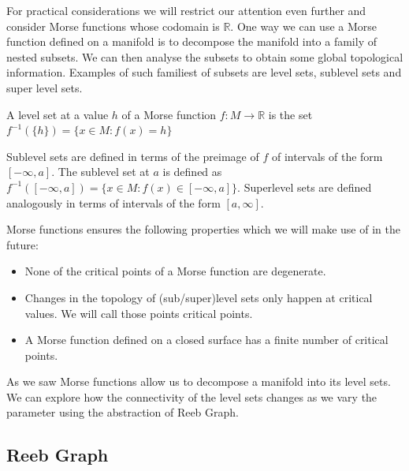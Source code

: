 For practical considerations we will restrict our attention even further and consider Morse functions whose codomain is $\mathbb{R}$. One way we can use a Morse function defined on a manifold is to decompose the manifold into a family of nested subsets. We can then analyse the subsets to obtain some global topological information. Examples of such familiest of subsets are level sets, sublevel sets and super level sets.

\begin{defn} A level set at a value $h$ of a Morse function $f: M \to \mathbb{R}$ is the set $f^{-1}(\{h\}) = \{x \in M: f(x) = h \}$   \end{defn}

Sublevel sets are defined in terms of the preimage of $f$ of intervals of the form $[-\infty, a]$. The sublevel set at $a$ is defined as $f^{-1}([-\infty, a]) = \{x \in M: f(x) \in [-\infty, a] \}$. Superlevel sets are defined analogously in terms of intervals of the form $[a, \infty]$.


Morse functions ensures the following properties which we will make use of in the future:

\begin{itemize}
    \item None of the critical points of a Morse function are degenerate.
    \item Changes in the topology of (sub/super)level sets only happen at critical values. We will call those points critical points.
    \item A Morse function defined on a closed surface has a finite number of critical points.
\end{itemize}

As we saw Morse functions allow us to decompose a manifold into its level sets. We can explore how the connectivity of the level sets changes as we vary the parameter using the abstraction of Reeb Graph.

\subsection{Reeb Graph}



